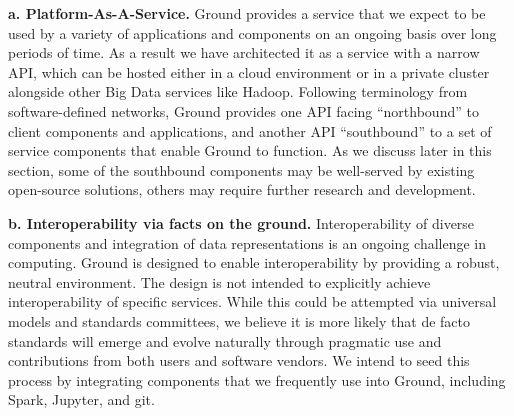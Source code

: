 \documentclass[10pt,letterpaper]{article}
\begin{document}
\vspace{0.5em}\noindent
\textbf{a. Platform-As-A-Service.}  Ground provides a service that we expect to be used by a variety of applications and components on an ongoing basis over long periods of time.  As a result we have architected it as a service with a narrow API, which can be hosted either in a cloud environment or in a private cluster alongside other Big Data services like Hadoop. Following terminology from software-defined networks, Ground provides one API facing ``northbound'' to client components and applications, and another API ``southbound'' to a set of service components that enable Ground to function.  As we discuss later in this section, some of the southbound components may be well-served by existing open-source solutions, others may require further research and development.

\vspace{0.5em}\noindent
\textbf{b. Interoperability via facts on the ground.}  
Interoperability of diverse components and integration of data representations is an ongoing challenge in computing. Ground is designed to enable interoperability by providing a robust, neutral environment. The design is not intended to explicitly achieve interoperability of specific services.  While this could be attempted via universal models and standards committees, we believe it is more likely that de facto standards will emerge and evolve naturally through pragmatic use and contributions from both users and software vendors.  We intend to seed this process by integrating components that we frequently use into Ground, including Spark, Jupyter, and git.

\end{document}
